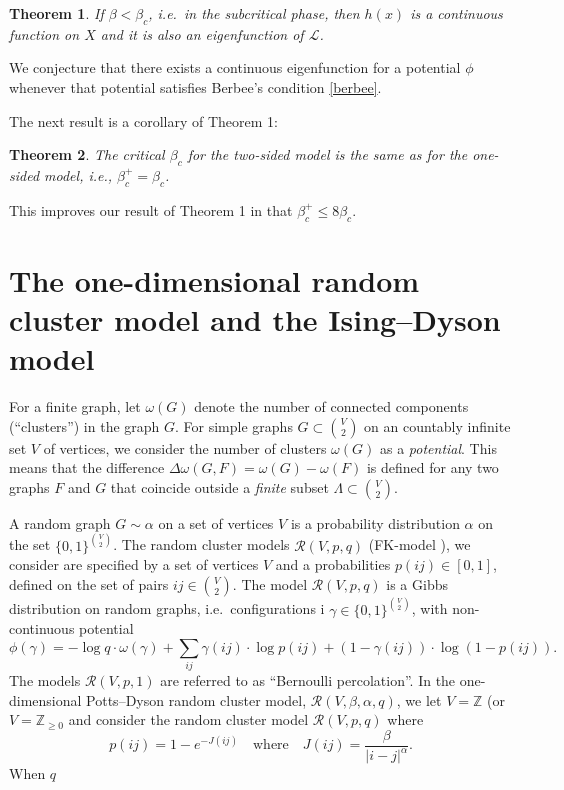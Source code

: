 \documentclass[11pt, a4paper]{amsart}
\newtheorem{thm}{Theorem}
\theoremstyle{definition}
\theoremstyle{remark}
\providecommand{\ZZ}{\mathbb{Z}}
\providecommand{\mscr}{\mathscr}
\providecommand{\w}{\omega}
\def\X{X}
\begin{document}
\begin{thm}\label{main} 
If $\beta<\beta_c$, i.e.\ in the subcritical phase,  
then $h(x)$ is a continuous function on $\X$ and it is also an 
eigenfunction of ${\mathcal L}$.
\end{thm}

We conjecture that there exists a continuous eigenfunction for a potential
$\phi$ whenever that potential satisfies Berbee's condition \eqref{berbee}.

The next result is a corollary of Theorem 1:

\begin{thm}
The critical $\beta_c$ for the two-sided model 
is the same as for the one-sided model, i.e., 
$\beta_c^+=\beta_c$.
\end{thm}

This improves our result of Theorem 1 in \cite{johob4}
that $\beta_c^+\leq 8\beta_c$.

\section{The one-dimensional random cluster model and the Ising--Dyson model}

For a finite graph, let $\w(G)$ denote the number of connected components
(``clusters'') in the graph $G$. For simple graphs $G\subset \binom V2$ on an
countably infinite set $V$ of vertices, we consider the number of clusters
$\w(G)$ as a \emph{potential}. This means that the difference
$\Delta\w(G,F) = \w(G)-\w(F)$ is defined for any two graphs $F$ and $G$ that
coincide outside a \emph{finite} subset $\Lambda\subset \binom V2$.

A random graph $G\sim\alpha$ on a set of vertices $V$ is a probability
distribution $\alpha$ on the set $\{0,1\}^{\binom V2}$. The random cluster
models $\mscr R(V,p,q)$ (FK-model \cite{grimmet}), we consider are specified by a set 
of vertices $V$ and a probabilities $p(ij)\in[0,1]$, defined on the set of pairs
$ij\in \binom V2$. The model $\mscr R(V,p,q)$ is a Gibbs distribution on random
graphs, i.e.\ configurations i $\gamma\in\{0,1\}^{\binom V2}$, with 
non-continuous potential
$$
\phi(\gamma) = 
- \log q \cdot\w(\gamma) + 
\sum_{ij}\gamma(ij)\cdot \log p(ij) + (1-\gamma(ij))\cdot\log (1-p(ij)).
$$
The models $\mscr R(V,p,1)$ are referred to as ``Bernoulli percolation''. 
In the one-dimensional Potts--Dyson random cluster model, 
$\mscr R(V,\beta,\alpha,q)$,
we let $V=\ZZ$ (or $V=\ZZ_{\ge0}$ and consider the random cluster model 
$\mscr R(V,p,q)$ where 
\begin{equation}\label{eq:Jdef}
  p(ij) = 1-e^{-J(ij)} \quad\text{where}\quad 
  J({ij}) = \frac \beta{|i-j|^\alpha}.
\end{equation}
When $q$
\end{document}
